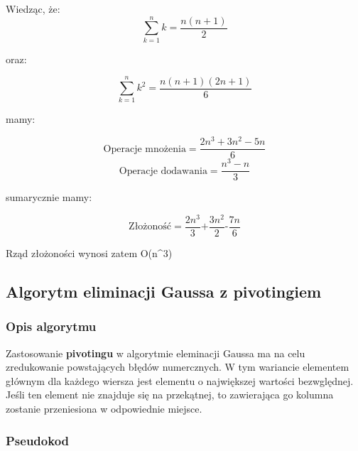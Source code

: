 \documentclass[12pt,a4paper,table]{article}
\begin{document}
    Wiedząc, że:
    \begin{equation}
        \sum_{k=1}^{n} k = \frac{n(n + 1)}{2}
    \end{equation}

    oraz:

    \begin{equation}
        \sum_{k=1}^{n} k^2 = \frac{n(n + 1)(2n + 1)}{6}
    \end{equation}

    mamy:

    \begin{equation}
        \text{Operacje mnożenia} = \frac{2n^3 + 3n^2 - 5n}{6}
    \end{equation}
    \begin{equation}
        \text{Operacje dodawania} = \frac{n^3 - n}{3} 
    \end{equation}

    sumarycznie mamy:
    
    \begin{equation}
        \text{Złożoność} = \frac{2n^3}{3} \text{+} \frac{3n^2}{2} \text{-} \frac{7n}{6}
    \end{equation}

    Rząd złożoności wynosi zatem O(n^3)
    
    \subsection{Algorytm eliminacji Gaussa z pivotingiem}    
    \subsubsection{Opis algorytmu}
    Zastosowanie \textbf{pivotingu} w algorytmie eleminacji Gaussa ma na celu zredukowanie powstających błędów numercznych. W tym wariancie elementem głównym dla każdego wiersza jest elementu o największej wartości bezwględnej. Jeśli ten element nie znajduje się na przekątnej, to zawierająca go kolumna zostanie przeniesiona w odpowiednie miejsce.
    \subsubsection{Pseudokod}
    
\end{document}
